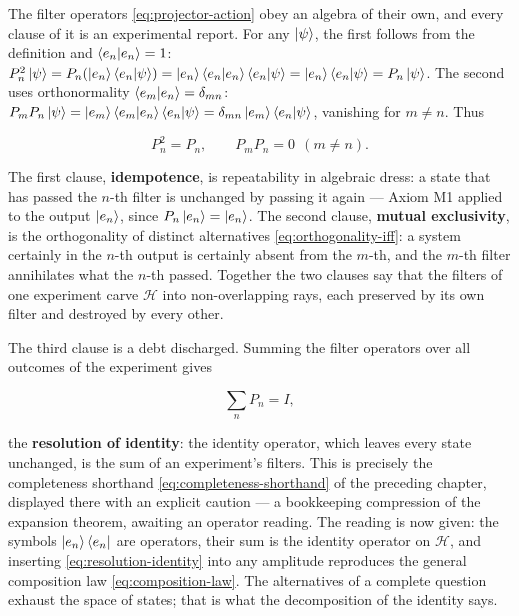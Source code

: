 The filter operators \eqref{eq:projector-action} obey an algebra of their own, and every clause of it is an experimental report. For any $\ket\psi$, the first follows from the definition and $\braket{e_n|e_n}=1$: $P_n^2\ket\psi = P_n(\ket{e_n}\braket{e_n|\psi}) = \ket{e_n}\braket{e_n|e_n}\braket{e_n|\psi} = \ket{e_n}\braket{e_n|\psi} = P_n\ket\psi$. The second uses orthonormality $\braket{e_m|e_n}=\delta_{mn}$: $P_mP_n\ket\psi = \ket{e_m}\braket{e_m|e_n}\braket{e_n|\psi} = \delta_{mn}\ket{e_m}\braket{e_n|\psi}$, vanishing for $m\neq n$. Thus
\begin{linenomath}
    \begin{equation}
        P_n^2 = P_n ,
        \qquad
        P_m P_n = 0 \ \ (m \neq n) .
        \label{eq:projector-algebra}
    \end{equation}
\end{linenomath}
The first clause, \textbf{idempotence}, is repeatability in algebraic dress: a state that has passed the $n$-th filter is unchanged by passing it again --- Axiom M1 applied to the output $\ket{e_n}$, since $P_n\ket{e_n} = \ket{e_n}$. The second clause, \textbf{mutual exclusivity}, is the orthogonality of distinct alternatives \eqref{eq:orthogonality-iff}: a system certainly in the $n$-th output is certainly absent from the $m$-th, and the $m$-th filter annihilates what the $n$-th passed. Together the two clauses say that the filters of one experiment carve $\mathcal{H}$ into non-overlapping rays, each preserved by its own filter and destroyed by every other.

The third clause is a debt discharged. Summing the filter operators over all outcomes of the experiment gives
\begin{linenomath}
    \begin{equation}
        \sum_n P_n = I ,
        \label{eq:resolution-identity}
    \end{equation}
\end{linenomath}
the \textbf{resolution of identity}: the identity operator, which leaves every state unchanged, is the sum of an experiment's filters. This is precisely the completeness shorthand \eqref{eq:completeness-shorthand} of the preceding chapter, displayed there with an explicit caution --- a bookkeeping compression of the expansion theorem, awaiting an operator reading. The reading is now given: the symbols $\ket{e_n}\bra{e_n}$ are operators, their sum is the identity operator on $\mathcal{H}$, and inserting \eqref{eq:resolution-identity} into any amplitude reproduces the general composition law \eqref{eq:composition-law}. The alternatives of a complete question exhaust the space of states; that is what the decomposition of the identity says.

